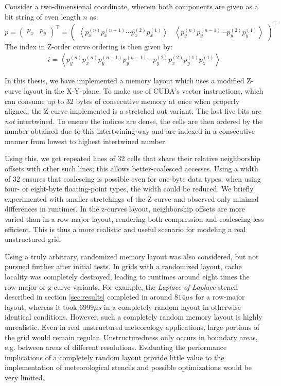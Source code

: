 Consider a two-dimensional coordinate, wherein both components are given as a bit string of even length $n$ as:
$$p=\begin{pmatrix}p_x & p_y\end{pmatrix}^\top=\begin{pmatrix}\left\langle p_x^{(n)} p_x^{(n-1)} \cdots p_x^{(2)} p_x^{(1)} \right\rangle & \left\langle p_y^{(n)} p_y^{(n-1)} \cdots p_y^{(2)} p_y^{(1)} \right\rangle\end{pmatrix}^\top$$
The index in Z-order curve ordering is then given by:
\begin{gather}
    i = \left\langle p_y^{(n)} p_x^{(n)} p_y^{(n-1)} p_y^{(n-1)} \cdots p_y^{(2)} p_x^{(2)} p_y^{(1)} p_x^{(1)}\right\rangle
\end{gather}

In this thesis, we have implemented a memory layout which uses a modified Z-curve layout in the X-Y-plane. To make use of CUDA's vector instructions, which can consume up to 32 bytes of consecutive memory at once when properly aligned, the Z-curve implemented is a stretched out variant. The last five bits are \emph{not} intertwined. To ensure the indices are dense, the cells are then ordered by the number obtained due to this intertwining way and are indexed in a consecutive manner from lowest to highest intertwined number.

Using this, we get repeated lines of 32 cells that share their relative neighborship offsets with other such lines; this allows better-coalesced accesses. Using a width of 32 ensures that coalescing is possible even for one-byte data types; when using four- or eight-byte floating-point types, the width could be reduced. We briefly experimented with smaller stretchings of the Z-curve and observed only minimal differences in runtimes. In the z-curves layout, neighborship offsets are more varied than in a row-major layout, rendering both compression and coalescing less efficient. This is thus a more realistic and useful scenario for modeling a real unstructured grid.

Using a truly arbitrary, randomized memory layout was also considered, but not pursued further after initial tests. In grids with a randomized layout, cache locality was completely destroyed, leading to runtimes around eight times the row-major or z-curve variants. For example, the \emph{Laplace-of-Laplace} stencil described in section \ref{sec:results} completed in around $814 \mu s$ for a row-major layout, whereas it took $6999 \mu s$ in a completely random layout in otherwise identical conditions. However, such a completely random memory layout is highly unrealistic. Even in real unstructured meteorology applications, large portions of the grid would remain regular. Unstructuredness only occurs in boundary areas, e.g. between areas of different resolutions. Evaluating the performance implications of a completely random layout provide little value to the implementation of meteorological stencils and possible optimizations would be very limited.


